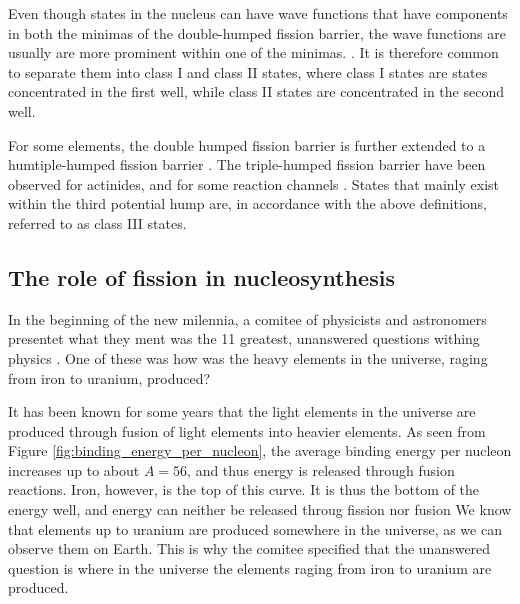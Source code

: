 \documentclass[]{article}
\begin{document}
\par
\vspace{3mm}

\noindent Even though states in the nucleus can have wave functions that have components in both the minimas of the double-humped fission barrier, the wave functions are usually are more prominent within one of the minimas. \cite{Wagemas1991}. It is therefore common to separate them into class I and class II states, where class I states are states concentrated in the first well, while class II states are concentrated in the second well. 

For some elements, the double humped fission barrier is further extended to a humtiple-humped fission barrier \cite{Goriely2017}. The triple-humped fission barrier have been observed for actinides, and for some reaction channels \cite{PhysRevC.74.014608}. States that mainly exist within the third potential hump are, in accordance with the above definitions, referred to as class III states. 
 
\subsection{The role of fission in nucleosynthesis}
\label{fission_in_astro}
In the beginning of the new milennia, a comitee of physicists and astronomers presentet what they ment was the 11 greatest, unanswered questions withing physics \cite{Haseltine2002}. One of these was how was the heavy elements in the universe, raging from iron to uranium, produced?

\par 
\vspace{3mm}
It has been known for some years that the light elements in the universe are produced through fusion of light elements into heavier elements. As seen from Figure \ref{fig:binding_energy_per_nucleon}, the average binding energy per nucleon increases up to about $A = 56$, and thus energy is released through fusion reactions. Iron, however, is the top of this curve. It is thus the bottom of the energy well, and energy can neither be released throug fission nor fusion We know that elements up to uranium are produced somewhere in the universe, as we can observe them on Earth. This is why the comitee specified that the unanswered question is where in the universe the elements raging from iron to uranium are produced. 

\par
\vspace{3mm}
\end{document}

